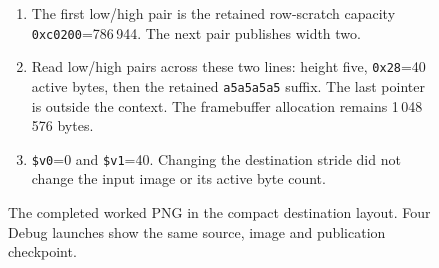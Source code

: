\begin{figure}[htbp]
\begin{minipage}{\linewidth}
\begin{enumerate}
      \item The first low/high pair is the retained row-scratch capacity \texttt{0xc0200}=786\,944. The next pair publishes width two.
      \item Read low/high pairs across these two lines: height five, \texttt{0x28}=40 active bytes, then the retained \texttt{a5a5a5a5} suffix. The last pointer is outside the context. The framebuffer allocation remains 1\,048\,576 bytes.
      \item \texttt{\$v0}=0 and \texttt{\$v1}=40. Changing the destination stride did not change the input image or its active byte count.
    \end{enumerate}
  \end{minipage}
  \caption{The completed worked PNG in the compact destination layout. Four Debug launches show the same source, image and publication checkpoint.}
  \label{fig:png-final-publication}
\end{figure}
